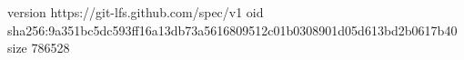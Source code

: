 version https://git-lfs.github.com/spec/v1
oid sha256:9a351bc5dc593ff16a13db73a5616809512c01b0308901d05d613bd2b0617b40
size 786528
